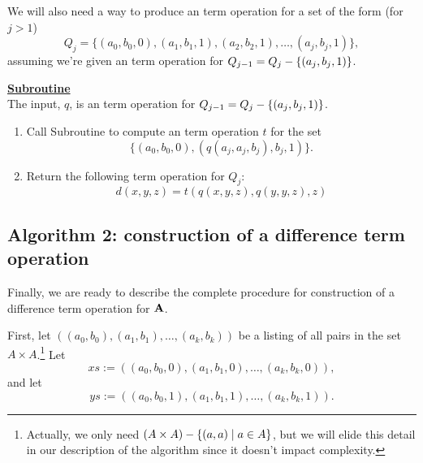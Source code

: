 \smallskip

We will also need a way to produce an \ld
term operation for a set of the form  (for $j>1$)
\begin{equation*}
Q_{j} = \{(a_0, b_0, 0), (a_1, b_1, 1), (a_2, b_2, 1), \dots, 
(a_{j}, b_{j}, 1)\},
\end{equation*}
assuming we're given an \ld term operation for 
$Q_{j-1} = Q_j - \{(a_j, b_j, 1)\}$.  

\medskip

\noindent \underline{\bf Subroutine }\\[4pt]
The input, $q$, is an \ld term operation for $Q_{j-1} = Q_j - \{(a_j, b_j, 1)\}$.  
\begin{enumerate}[1.]
\item 
Call Subroutine  to compute an \ld term operation $t$ for the set
\begin{equation*}
\{(a_0, b_0, 0), (q(a_j, a_j, b_j), b_j, 1)\}.
\end{equation*}
\item Return the following 
\ld term operation for $Q_j$: 
\begin{equation*}
d(x,y,z) = t(q(x,y,z), q(y,y,z), z)
\end{equation*}
\end{enumerate}




\subsection{Algorithm 2: construction of a difference term operation}
\label{sec:algor-2}
Finally, we are ready to describe the complete procedure for construction
of a difference term operation for $\mathbf{A}$.  

First, let 
$((a_0, b_0), (a_1, b_1), \dots, (a_k, b_k))$ 
be a listing of all pairs in the set $A\times A$.\footnote{Actually, we only need
$(A \times A) - \{(a,a) \mid a \in A\}$, but we will elide this
detail in our description of the algorithm since it doesn't impact 
complexity.}
Let 
\begin{equation*}
xs := %
((a_0, b_0, 0), (a_1, b_1, 0), \dots, (a_k, b_k, 0)), 
\end{equation*}
and let 
\begin{equation*}
ys := %
((a_0, b_0, 1), (a_1, b_1, 1), \dots, (a_k, b_k, 1)). 
\end{equation*}

